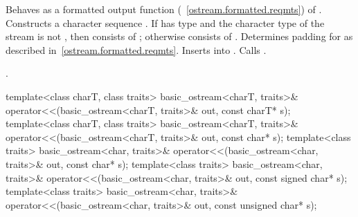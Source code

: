 \begin{itemdescr}
\pnum
\effects
Behaves as a formatted output function
(~\ref{ostream.formatted.reqmts}) of . 
Constructs a character sequence . 
If  has type
and the character type of the stream is not
,
then  consists of
;
otherwise  consists of
. Determines padding for  as described
in~\ref{ostream.formatted.reqmts}. Inserts  into
. Calls .

\pnum
\returns
{}.
\end{itemdescr}

%
%
\begin{itemdecl}
template<class charT, class traits>
  basic_ostream<charT, traits>& operator<<(basic_ostream<charT, traits>& out,
                                           const charT* s);
template<class charT, class traits>
  basic_ostream<charT, traits>& operator<<(basic_ostream<charT, traits>& out,
                                           const char* s);
template<class traits>
  basic_ostream<char, traits>& operator<<(basic_ostream<char, traits>& out,
                                          const char* s);
template<class traits>
  basic_ostream<char, traits>& operator<<(basic_ostream<char, traits>& out,
                                          const signed char* s);
template<class traits>
  basic_ostream<char, traits>& operator<<(basic_ostream<char, traits>& out,
                                          const unsigned char* s);
\end{itemdecl}

